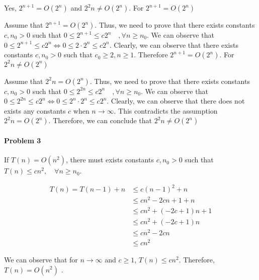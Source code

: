 \documentclass[11pt]{article}
\begin{document}
\begin{flushleft}
    Yes, $2^{n+1} =  O(2^n)$ and $2^2n \neq O(2^n).$ \newline\newline
    For $2^{n+1} =  O(2^n)$
    \newline

    Assume that $2^{n+1} =  O(2^n)$. Thus, we need to prove that there exists constants $c, n_0 > 0 $ such that $0 \leq 2^{n+1} \leq c 2^n \quad ,\forall n \geq n_0.$
    We can observe that 
    $0 \leq 2^{n+1} \leq c 2^n \Leftrightarrow 0 \leq 2 \cdot 2^n \leq c 2^n$.
    \newline \newline
    Clearly, we can observe that there exists constants $c, n_0 > 0$ such that $c_0 \geq 2, n \geq 1$. Therefore $2^{n+1} =  O(2^n)$.
    \newline\newline
    For $2^2n \neq O(2^n)$
    \newline

    Assume that $2^2n = O(2^n)$. Thus, we need to prove that there exists constants $c, n_0 > 0 $ such that $0 \leq 2^{2n} \leq c 2^n \quad ,\forall n \geq n_0.$
    We can observe that 
    $0 \leq 2^{2n} \leq c 2^n \Leftrightarrow 0 \leq 2^n \cdot 2^n \leq c 2^n$.
    \newline \newline
    Clearly, we can observe that there does not exists any constants $c$ when $n \rightarrow \infty$. This contradicts the assumption $2^2n = O(2^n)$. Therefore, we can conclude that $2^2n \neq O(2^n)$
    \newline
\end{flushleft}

\paragraph{\noindent\textbf{\LARGE{Problem 3}}}

\begin{flushleft}
    If $T(n) = O(n^2)$, there must exists constants $c, n_0 > 0$ such that $ T(n) \leq cn^2, \quad \forall   n \geq n_0$.
\end{flushleft}
\begin{equation*}
\begin {split}
    T(n) = T(n-1) + n &\leq c(n-1)^2 + n    \\
    &\leq cn^2 - 2cn + 1 + n \\
    &\leq cn^2 + (-2c + 1)n + 1 \\
    &\leq cn^2 + (-2c + 1)n \\
    &\leq cn^2 - 2cn \\
    &\leq cn^2
\end {split}
\end{equation*}
\begin{flushleft}
    We can observe that for $n \rightarrow \infty$ and $c \geq 1$, \quad $T(n) \leq cn^2$. Therefore, $T(n) = O(n^2)$ .
\end{flushleft}
\end{document}
